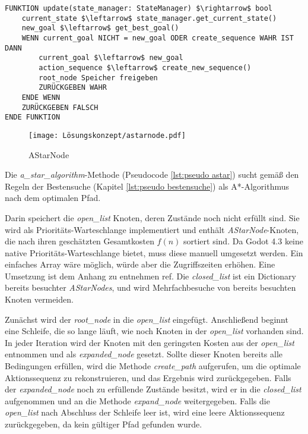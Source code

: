 \begin{lstlisting}[language=Pseudo, caption={update Methode des GoapAgent}, mathescape=true, label={lst:pseudo planner update}]
FUNKTION update(state_manager: StateManager) $\rightarrow$ bool
    current_state $\leftarrow$ state_manager.get_current_state()
    new_goal $\leftarrow$ get_best_goal()
    WENN current_goal NICHT = new_goal ODER create_sequence WAHR IST DANN
        current_goal $\leftarrow$ new_goal
        action_sequence $\leftarrow$ create_new_sequence()
        root_node Speicher freigeben
        ZURÜCKGEBEN WAHR
    ENDE WENN
    ZURÜCKGEBEN FALSCH
ENDE FUNKTION
\end{lstlisting}

\begin{figure}[h]
  \centering
  \texttt{[image: Lösungskonzept/astarnode.pdf]}
	\captionsetup{justification=justified, format=plain}
  \caption{AStarNode}
  \label{fig:AStarNode}
\end{figure}

Die \textit{a\_star\_algorithm}-Methode (Pseudocode \ref{lst:pseudo astar}) sucht gemäß den Regeln der Bestensuche (Kapitel \ref{lst:pseudo bestensuche}) als A*-Algorithmus nach dem optimalen Pfad.

Darin speichert die \textit{open\_list} Knoten, deren Zustände noch nicht erfüllt sind. Sie wird als Prioritäts-Warteschlange implementiert und enthält \textit{AStarNode}-Knoten, die nach ihren geschätzten Gesamtkosten $f(n)$ sortiert sind. Da Godot 4.3 keine native Prioritäts-Warteschlange bietet, muss diese manuell umgesetzt werden. Ein einfaches Array wäre möglich, würde aber die Zugriffszeiten erhöhen. Eine Umsetzung ist dem Anhang zu entnehmen ref{}. Die \textit{closed\_list} ist ein Dictionary bereits besuchter \textit{AStarNodes}, und wird Mehrfachbesuche von bereits besuchten Knoten vermeiden. 

Zunächst wird der \textit{root\_node} in die \textit{open\_list} eingefügt. Anschließend beginnt eine Schleife, die so lange läuft, wie noch Knoten in der \textit{open\_list} vorhanden sind. In jeder Iteration wird der Knoten mit den geringsten Kosten aus der \textit{open\_list} entnommen und als \textit{expanded\_node} gesetzt. Sollte dieser Knoten bereits alle Bedingungen erfüllen, wird die Methode \textit{create\_path} aufgerufen, um die optimale Aktionssequenz zu rekonstruieren, und das Ergebnis wird zurückgegeben. Falls der \textit{expanded\_node} noch zu erfüllende Zustände besitzt, wird er in die \textit{closed\_list} aufgenommen und an die Methode \textit{expand\_node} weitergegeben. Falls die \textit{open\_list} nach Abschluss der Schleife leer ist, wird eine leere Aktionssequenz zurückgegeben, da kein gültiger Pfad gefunden wurde.


